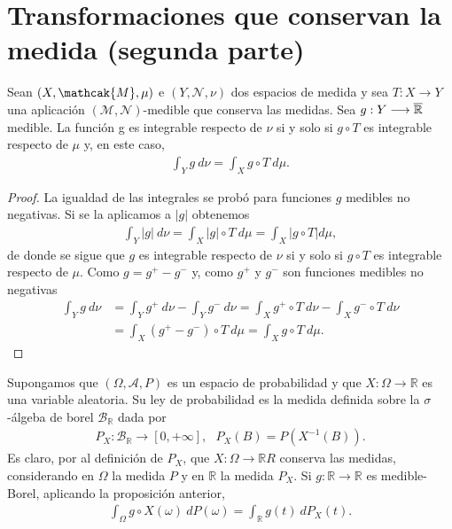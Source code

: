 \section{Transformaciones que conservan la medida (segunda parte)}

\begin{teo}
Sean $(X, \mathcak{M}, \mu)$ e $(Y, \mathcal{N},\nu)$ dos espacios de medida y sea $T: X \longrightarrow Y$ una aplicación $(\mathcal{M},\mathcal{N})$-medible que conserva las medidas. Sea $g: Y \longrightarrow \overline{\mathbb{R}}$ medible. La función g es integrable respecto de $\nu$ si y solo si $g \circ T$ es integrable respecto de $\mu$ y, en este caso, 
\begin{align*}
    \int_{Y}{g \ d\nu} = \int_{X}{g \circ T \ d\mu}.
\end{align*}
\end{teo}

\begin{proof}
La igualdad de las integrales se probó para funciones $g$ medibles no negativas. Si se la aplicamos a $|g|$ obtenemos
\begin{align*}
    \int_{Y}{|g| \ d\nu} = \int_{X}{|g|\circ T \ d\mu} = \int_{X}{|g \circ T| d\mu},
\end{align*}
de donde se sigue que $g$ es integrable respecto de $\nu$ si y solo si $g \circ T$ es integrable respecto de $\mu$. Como $g = g^+ - g^-$ y, como $g^+$ y $g^-$ son funciones medibles no negativas
\begin{align*}
    \int_{Y}{g \ d\nu} &= \int_{Y}{g^+ \ d\nu} - \int_{Y}{g^- \ d\nu} = \int_{X}{g^+ \circ T \ d\nu} - \int_{X}{g^- \circ T \ d\nu}\\
    &= \int_{X}{(g^+ - g^-) \circ T \ d\mu} = \int_{X}{g \circ T \ d\mu}.
\end{align*}
\end{proof}

\begin{ejemplo}
Supongamos que $(\Omega, \mathcal{A}, P)$ es un espacio de probabilidad y que $X: \Omega \longrightarrow \mathbb{R}$ es una variable aleatoria. Su ley de probabilidad es la medida definida sobre la $\sigma$-álgeba de borel $\mathcal{B}_{\mathbb{R}}$ dada por
\begin{align*}
    P_X: \mathcal{B}_{\mathbb{R}} \longrightarrow [0,+\infty], \ \ \ P_X(B) = P(X^{-1}(B)).
\end{align*}
Es claro, por al definición de $P_X$, que $X: \Omega \longrightarrow \mathbb{R}R$ conserva las medidas, considerando en $\Omega$ la medida $P$ y en $\mathbb{R}$ la medida $P_X$. Si $g: \mathbb{R} \longrightarrow \mathbb{R}$ es medible-Borel, aplicando la proposición anterior,
\begin{align*}
    \int_{\Omega}{g \circ X(\omega) \ dP(\omega)} = \int_{\mathbb{R}}{g(t) \ dP_X(t)}.
\end{align*}
\end{ejemplo}

